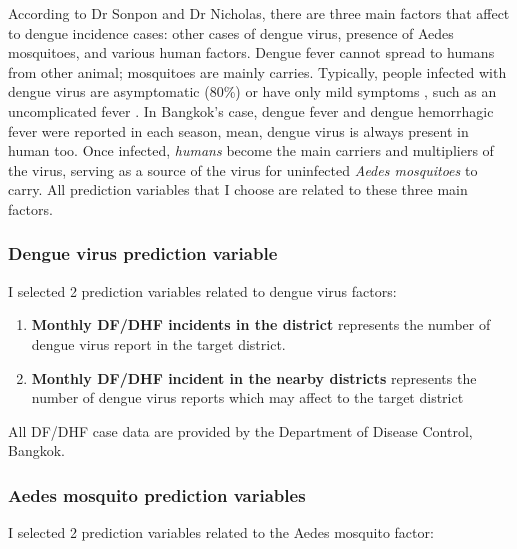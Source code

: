 \documentclass[review]{elsarticle}
\begin{document}
According to Dr Sonpon and Dr Nicholas, there are three main factors that affect to dengue incidence cases: other cases of dengue virus, presence of Aedes mosquitoes, and various human factors. Dengue fever cannot spread to humans from other animal; mosquitoes are mainly carries. Typically, people infected with dengue virus are asymptomatic (80\%) or have only mild symptoms , such as an uncomplicated fever \cite{whitehorn2010dengue,reiter2010yellow}. In Bangkok's case, dengue fever and dengue hemorrhagic fever were reported in each season,  mean, dengue virus  is always present in human too. Once infected, \textit{humans} become the main carriers and multipliers of the virus, serving as a source of the virus for uninfected \textit{Aedes mosquitoes} to carry. All prediction variables that I choose are related to these three main factors. 

\subsubsection{Dengue virus prediction variable}

I selected 2 prediction variables related to dengue virus factors: 

\begin{enumerate}
	
	\item \textbf{Monthly DF/DHF incidents in the district} represents the number of dengue virus report in the target district. 
	
	\item \textbf{Monthly DF/DHF incident in the nearby districts} represents the number of dengue virus reports which may affect to the target district
	
\end{enumerate}

All DF/DHF case data are provided by the Department of Disease Control, Bangkok.


\subsubsection{Aedes mosquito prediction variables}

I selected 2 prediction variables related to the Aedes mosquito factor:
\end{document}
